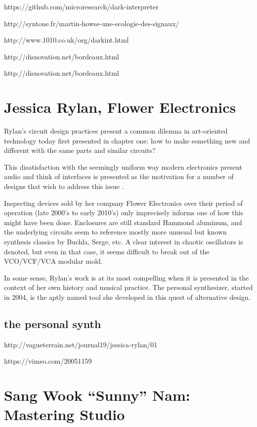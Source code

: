 https://github.com/microresearch/dark-interpreter

http://syntone.fr/martin-howse-une-ecologie-des-signaux/

http://www.1010.co.uk/org/darkint.html

http://disnovation.net/bordeaux.html

http://disnovation.net/bordeaux.html

\section{Jessica Rylan, Flower Electronics}

Rylan's circuit design practices present a common dilemna in art-oriented technology today first presented in chapter one: how to make something new and different with the same parts and similar circuits? 

This disatisfaction with the seemingly uniform way modern electronics present audio and think of interfaces is presented as the motivation for a number of designs that wish to address this issue \citep[pp.139-155]{rodgers2010}. 

Inspecting devices sold by her company Flower Electronics over their period of operation (late 2000's to early 2010's) only imprecisely informs one of how this might have been done. Enclosures are still standard Hammond aluminum, and the underlying circuits seem to reference mostly more unusual but known synthesis classics by Buchla, Serge, etc. A clear interest in chaotic oscillators is denoted, but even in that case, it seems difficult to break out of the VCO/VCF/VCA modular mold. 

In some sense, Rylan's work is at its most compelling when it is presented in the context of her own history and musical practice. The personal synthesizer, started in 2004, is the aptly named tool she developed in this quest of alternative design. 

\subsection{the personal synth}

http://vagueterrain.net/journal19/jessica-rylan/01

https://vimeo.com/20051159



\section{Sang Wook ``Sunny'' Nam: Mastering Studio}

